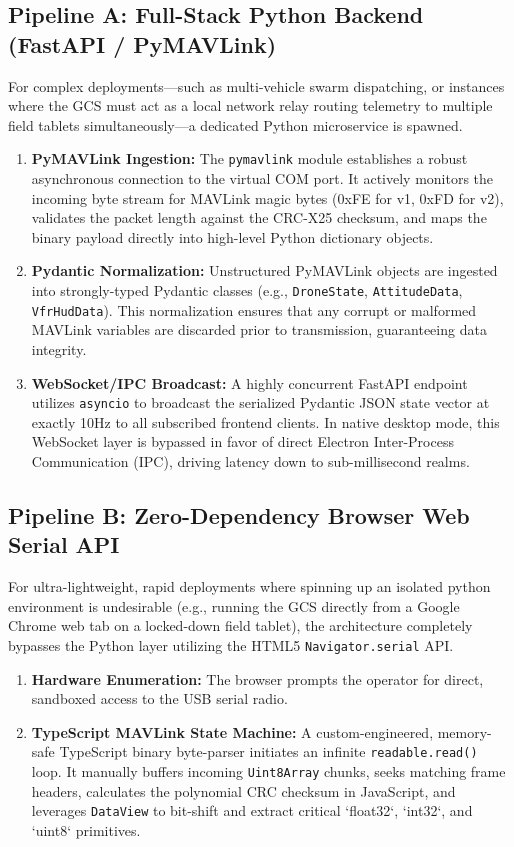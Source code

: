 \subsection{Pipeline A: Full-Stack Python Backend (FastAPI / PyMAVLink)}
For complex deployments—such as multi-vehicle swarm dispatching, or instances where the GCS must act as a local network relay routing telemetry to multiple field tablets simultaneously—a dedicated Python microservice is spawned.
\begin{enumerate}
    \item \textbf{PyMAVLink Ingestion:} The \texttt{pymavlink} module establishes a robust asynchronous connection to the virtual COM port. It actively monitors the incoming byte stream for MAVLink magic bytes (0xFE for v1, 0xFD for v2), validates the packet length against the CRC-X25 checksum, and maps the binary payload directly into high-level Python dictionary objects.
    \item \textbf{Pydantic Normalization:} Unstructured PyMAVLink objects are ingested into strongly-typed Pydantic classes (e.g., \texttt{DroneState}, \texttt{AttitudeData}, \texttt{VfrHudData}). This normalization ensures that any corrupt or malformed MAVLink variables are discarded prior to transmission, guaranteeing data integrity.
    \item \textbf{WebSocket/IPC Broadcast:} A highly concurrent FastAPI endpoint utilizes \texttt{asyncio} to broadcast the serialized Pydantic JSON state vector at exactly 10Hz to all subscribed frontend clients. In native desktop mode, this WebSocket layer is bypassed in favor of direct Electron Inter-Process Communication (IPC), driving latency down to sub-millisecond realms.
\end{enumerate}

\subsection{Pipeline B: Zero-Dependency Browser Web Serial API}
For ultra-lightweight, rapid deployments where spinning up an isolated python environment is undesirable (e.g., running the GCS directly from a Google Chrome web tab on a locked-down field tablet), the architecture completely bypasses the Python layer utilizing the HTML5 \texttt{Navigator.serial} API.
\begin{enumerate}
    \item \textbf{Hardware Enumeration:} The browser prompts the operator for direct, sandboxed access to the USB serial radio.
    \item \textbf{TypeScript MAVLink State Machine:} A custom-engineered, memory-safe TypeScript binary byte-parser initiates an infinite \texttt{readable.read()} loop. It manually buffers incoming \texttt{Uint8Array} chunks, seeks matching frame headers, calculates the polynomial CRC checksum in JavaScript, and leverages \texttt{DataView} to bit-shift and extract critical `float32`, `int32`, and `uint8` primitives.
\end{enumerate}

